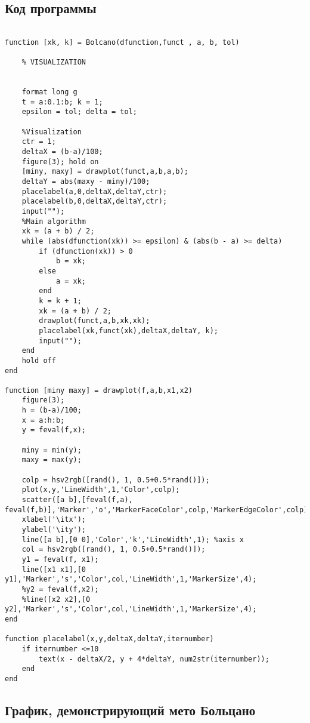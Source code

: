 \documentclass[a4paper,12pt]{article}
\begin{document}
\subsection*{Код программы}
\begin{lstlisting}[style=Matlab-editor, caption=Метод Больцано]

function [xk, k] = Bolcano(dfunction,funct , a, b, tol) 
    
    % VISUALIZATION

    
    format long g
    t = a:0.1:b; k = 1;
    epsilon = tol; delta = tol;

    %Visualization
    ctr = 1;
    deltaX = (b-a)/100;
    figure(3); hold on
    [miny, maxy] = drawplot(funct,a,b,a,b);
    deltaY = abs(maxy - miny)/100;
    placelabel(a,0,deltaX,deltaY,ctr);
    placelabel(b,0,deltaX,deltaY,ctr);
    input("");
    %Main algorithm
    xk = (a + b) / 2;
    while (abs(dfunction(xk)) >= epsilon) & (abs(b - a) >= delta)
        if (dfunction(xk)) > 0
            b = xk;
        else
            a = xk;
        end
        k = k + 1;
        xk = (a + b) / 2;
        drawplot(funct,a,b,xk,xk);
        placelabel(xk,funct(xk),deltaX,deltaY, k);
        input("");
    end
    hold off
end

function [miny maxy] = drawplot(f,a,b,x1,x2)
    figure(3); 
    h = (b-a)/100;
    x = a:h:b;
    y = feval(f,x);
    
    miny = min(y);
    maxy = max(y);
    
    colp = hsv2rgb([rand(), 1, 0.5+0.5*rand()]);
    plot(x,y,'LineWidth',1,'Color',colp);
    scatter([a b],[feval(f,a), feval(f,b)],'Marker','o','MarkerFaceColor',colp,'MarkerEdgeColor',colp);
    xlabel('\itx');
    ylabel('\ity');
    line([a b],[0 0],'Color','k','LineWidth',1); %axis x
    col = hsv2rgb([rand(), 1, 0.5+0.5*rand()]);
    y1 = feval(f, x1);
    line([x1 x1],[0 y1],'Marker','s','Color',col,'LineWidth',1,'MarkerSize',4); 
    %y2 = feval(f,x2);
    %line([x2 x2],[0 y2],'Marker','s','Color',col,'LineWidth',1,'MarkerSize',4); 
end

function placelabel(x,y,deltaX,deltaY,iternumber)
    if iternumber <=10
        text(x - deltaX/2, y + 4*deltaY, num2str(iternumber));
    end
end

\end{lstlisting}

\subsection*{График, демонстрирующий мето Больцано}
\end{document}
